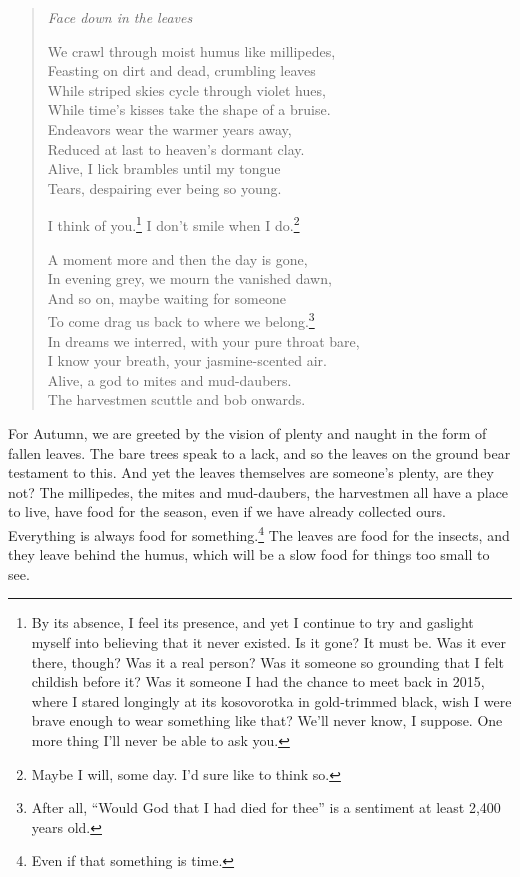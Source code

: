 \documentclass[12pt,oneside]{memoir}
\begin{document}
\begin{verse}
\emph{Face down in the leaves}

We crawl through moist humus like millipedes, \\
Feasting on dirt and dead, crumbling leaves \\
While striped skies cycle through violet hues, \\
While time's kisses take the shape of a bruise. \\
Endeavors wear the warmer years away, \\
Reduced at last to heaven's dormant clay. \\
Alive, I lick brambles until my tongue \\
Tears, despairing ever being so young.

I think of you.\footnote{By its absence, I feel its presence, and yet I continue to try and gaslight myself into believing that it never existed. Is it gone? It must be. Was it ever there, though? Was it a real person? Was it someone so grounding that I felt childish before it? Was it someone I had the chance to meet back in 2015, where I stared longingly at its kosovorotka in gold-trimmed black, wish I were brave enough to wear something like that? We'll never know, I suppose. One more thing I'll never be able to ask you.} I don't smile when I do.\footnote{Maybe I will, some day. I'd sure like to think so.}

A moment more and then the day is gone, \\
In evening grey, we mourn the vanished dawn, \\
And so on, maybe waiting for someone \\
To come drag us back to where we belong.\footnote{After all, ``Would God that I had died for thee'' is a sentiment at least 2,400 years old.} \\
In dreams we interred, with your pure throat bare, \\
I know your breath, your jasmine-scented air. \\
Alive, a god to mites and mud-daubers. \\
The harvestmen scuttle and bob onwards.

\parencite[9]{leaves}
\end{verse}

For Autumn, we are greeted by the vision of plenty and naught in the form of fallen leaves. The bare trees speak to a lack, and so the leaves on the ground bear testament to this. And yet the leaves themselves are someone's plenty, are they not? The millipedes, the mites and mud-daubers, the harvestmen all have a place to live, have food for the season, even if we have already collected ours. Everything is always food for something.\footnote{Even if that something is time.} The leaves are food for the insects, and they leave behind the humus, which will be a slow food for things too small to see.
\end{document}
